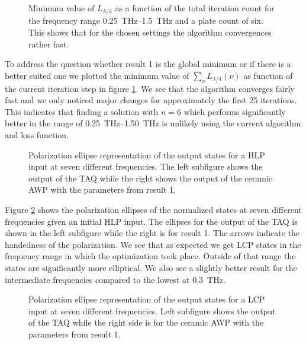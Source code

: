\begin{figure}[H]
    \centering
    
    \caption{Minimum value of $L_{\lambda/4}$ as a function of the total iteration count for the frequency range \SIrange{0.25}{1.5}{\tera \hertz} and a plate count of six. This shows that for the chosen settings the algorithm convergences rather fast.}
    \label{fig:cl4_convergence}
\end{figure}

To address the question whether result 1 is the global minimum or if there is a better suited one we plotted the minimum value of $\sum_{\nu}L_{\lambda/4}(\nu)$ as function of the current iteration step in figure  \ref{fig:cl4_convergence}. We see that the algorithm converges fairly fast and we only noticed major changes for approximately the first 25 iterations. This indicates that finding a solution with $n=6$ which performs significantly better in the range of \SIrange{0.25}{1.50}{\tera \hertz} is unlikely using the current algorithm and loss function.

\begin{figure}[H]
    \centering
    
    \caption{Polarization ellipse representation of the output states for a HLP input at seven different frequencies. The left subfigure shows the output of the TAQ while the right shows the output of the ceramic AWP with the parameters from result 1.}
    \label{fig:cl4_pe_lp}
\end{figure}

Figure \ref{fig:cl4_pe_lp} shows the polarization ellipses of the normalized states at seven different frequencies given an initial HLP input. The ellipses for the output of the TAQ is shown in the left subfigure while the right is for result 1. The arrows indicate the handedness of the polarization. We see that as expected we get LCP states in the frequency range in which the optimization took place. Outside of that range the states are significantly more elliptical. We also see a slightly better result for the intermediate frequencies compared to the lowest at \SI{0.3}{\tera \hertz}. 


\begin{figure}[H]
    \centering
    
    \caption{Polarization ellipse representation of the output states for a LCP input at seven different frequencies. Left subfigure shows the output of the TAQ while the right side is for the ceramic AWP with the parameters from result 1.}
    \label{fig:cl4_pe_cp}
\end{figure}

